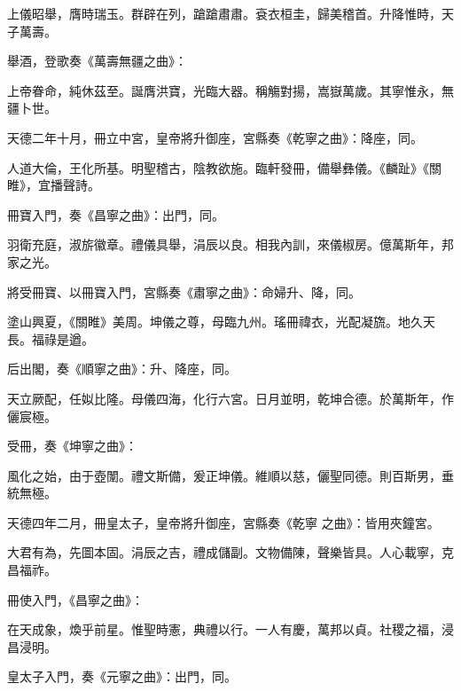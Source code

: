 \begin{pinyinscope}
 上儀昭舉，膺時瑞玉。群辟在列，蹌蹌肅肅。袞衣桓圭，歸美稽首。升降惟時，天子萬壽。



 舉酒，登歌奏《萬壽無疆之曲》：



 上帝眷命，純休茲至。誕膺洪寶，光臨大器。稱觴對揚，嵩嶽萬歲。其寧惟永，無疆卜世。



 天德二年十月，冊立中宮，皇帝將升御座，宮縣奏《乾寧之曲》：降座，同。



 人道大倫，王化所基。明聖稽古，陰教欲施。臨軒發冊，備舉彝儀。《麟趾》《關睢》，宜播聲詩。



 冊寶入門，奏《昌寧之曲》：出門，同。



 羽衛充庭，淑旂徽章。禮儀具舉，涓辰以良。相我內訓，來儀椒房。億萬斯年，邦家之光。



 將受冊寶、以冊寶入門，宮縣奏《肅寧之曲》：命婦升、降，同。



 塗山興夏，《關睢》美周。坤儀之尊，母臨九州。瑤冊禕衣，光配凝旒。地久天長。福祿是遒。



 后出閣，奏《順寧之曲》：升、降座，同。



 天立厥配，任姒比隆。母儀四海，化行六宮。日月並明，乾坤合德。於萬斯年，作儷宸極。



 受冊，奏《坤寧之曲》：



 風化之始，由于壺闈。禮文斯備，爰正坤儀。維順以慈，儷聖同德。則百斯男，垂統無極。



 天德四年二月，冊皇太子，皇帝將升御座，宮縣奏《乾寧
 之曲》：皆用夾鐘宮。



 大君有為，先圖本固。涓辰之吉，禮成儲副。文物備陳，聲樂皆具。人心載寧，克昌福祚。



 冊使入門，《昌寧之曲》：



 在天成象，煥乎前星。惟聖時憲，典禮以行。一人有慶，萬邦以貞。社稷之福，浸昌浸明。



 皇太子入門，奏《元寧之曲》：出門，同。




\end{pinyinscope}
